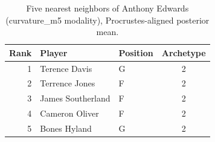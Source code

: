 \begin{table}[htbp]
  \centering\small
  \begin{tabular}{rllc}
    \toprule
    Rank & Player & Position & Archetype \\
    \midrule
    1 & Terence Davis & G & 2 \\
    2 & Terrence Jones & F & 2 \\
    3 & James Southerland & F & 2 \\
    4 & Cameron Oliver & F & 2 \\
    5 & Bones Hyland & G & 2 \\
    \bottomrule
  \end{tabular}
  \caption{Five nearest neighbors of Anthony Edwards (curvature_m5 modality), Procrustes-aligned posterior mean.}
  \label{tab:Anthony_Edwards_neighbors_curvature_m5}
\end{table}

